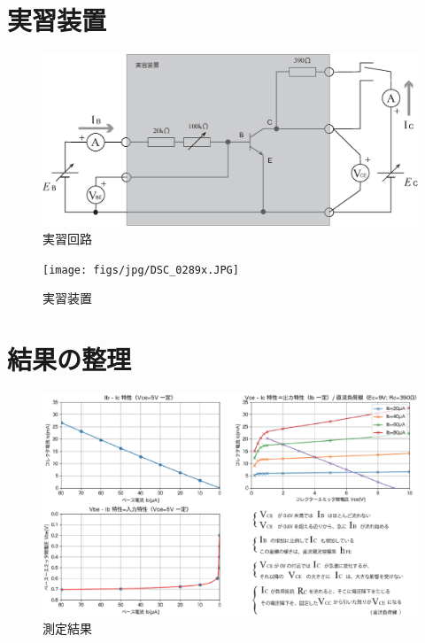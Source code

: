 \documentclass[uplatex,a4paper,11pt,oneside,openany]{jsarticle}
\begin{document}
	\section{実習装置}
	
	\begin{multicols}{2}
		\begin{figure}[H]
			\centering
			\includegraphics[keepaspectratio, scale=0.3, angle=0]
			{figs/eps/ex0.eps}
			\caption{実習回路}
			\label{fig:ex0}
		\end{figure}
		
		\begin{figure}[H]
			\centering
			\texttt{[image: figs/jpg/DSC\_0289x.JPG]}
			\caption{実習装置}
			\label{fig:ex1}
		\end{figure}
	\end{multicols}
	
	\section{結果の整理}
	
	\setlength{\voffset}{-2cm}
	\begin{figure}[H]
		\centering
		\includegraphics[keepaspectratio, scale=0.75, angle=90]
		{figs/eps/statictate.eps}
		\caption{測定結果}
		\label{fig:ex4}
	\end{figure}
\end{document}
